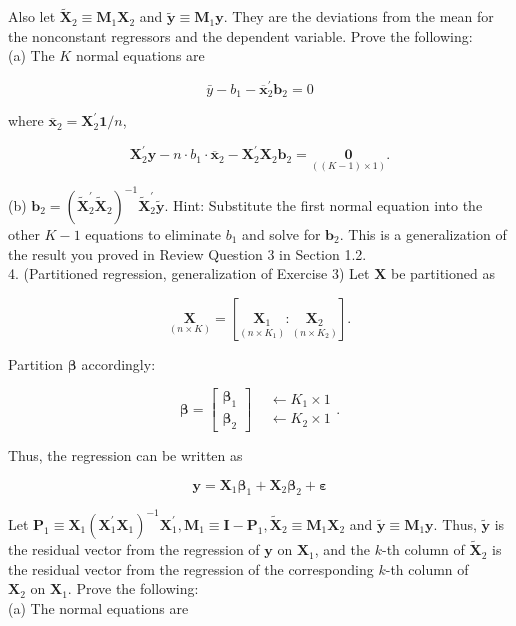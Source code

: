 \documentclass[10pt]{article}
\begin{document}
Also let $\widetilde{\mathbf{X}}_{2} \equiv \mathbf{M}_{1} \mathbf{X}_{2}$ and $\tilde{\mathbf{y}} \equiv \mathbf{M}_{1} \mathbf{y}$. They are the deviations from the mean for the nonconstant regressors and the dependent variable. Prove the following:\\
(a) The $K$ normal equations are

$$
\bar{y}-b_{1}-\overline{\mathbf{x}}_{2}^{\prime} \mathbf{b}_{2}=0
$$

where $\overline{\mathbf{x}}_{2}=\mathbf{X}_{2}^{\prime} \mathbf{1} / n$,

$$
\mathbf{X}_{2}^{\prime} \mathbf{y}-n \cdot b_{1} \cdot \overline{\mathbf{x}}_{2}-\mathbf{X}_{2}^{\prime} \mathbf{X}_{2} \mathbf{b}_{2}=\underset{((K-1) \times 1)}{\mathbf{0}} .
$$

(b) $\mathbf{b}_{2}=\left(\widetilde{\mathbf{X}}_{2}^{\prime} \widetilde{\mathbf{X}}_{2}\right)^{-1} \widetilde{\mathbf{X}}_{2}^{\prime} \tilde{\mathbf{y}}$. Hint: Substitute the first normal equation into the other $K-1$ equations to eliminate $b_{1}$ and solve for $\mathbf{b}_{2}$. This is a generalization of the result you proved in Review Question 3 in Section 1.2.\\
4. (Partitioned regression, generalization of Exercise 3) Let $\mathbf{X}$ be partitioned as

$$
\underset{(n \times K)}{\mathbf{X}}=\left[\underset{\left(n \times K_{1}\right)}{\mathbf{X}_{1}}: \underset{\left(n \times K_{2}\right)}{\mathbf{X}_{2}}\right] .
$$

Partition $\boldsymbol{\beta}$ accordingly:

$$
\boldsymbol{\beta}=\left[\begin{array}{l}
\boldsymbol{\beta}_{1} \\
\boldsymbol{\beta}_{2}
\end{array}\right] \begin{aligned}
& \leftarrow K_{1} \times 1 \\
& \leftarrow K_{2} \times 1
\end{aligned} .
$$

Thus, the regression can be written as

$$
\mathbf{y}=\mathbf{X}_{1} \boldsymbol{\beta}_{1}+\mathbf{X}_{2} \boldsymbol{\beta}_{2}+\boldsymbol{\varepsilon}
$$

Let $\mathbf{P}_{1} \equiv \mathbf{X}_{1}\left(\mathbf{X}_{1}^{\prime} \mathbf{X}_{1}\right)^{-1} \mathbf{X}_{1}^{\prime}, \mathbf{M}_{1} \equiv \mathbf{I}-\mathbf{P}_{1}, \widetilde{\mathbf{X}}_{2} \equiv \mathbf{M}_{1} \mathbf{X}_{2}$ and $\tilde{\mathbf{y}} \equiv \mathbf{M}_{1} \mathbf{y}$. Thus, $\tilde{\mathbf{y}}$ is the residual vector from the regression of $\mathbf{y}$ on $\mathbf{X}_{1}$, and the $k$-th column of $\widetilde{\mathbf{X}}_{2}$ is the residual vector from the regression of the corresponding $k$-th column of\\
$\mathbf{X}_{2}$ on $\mathbf{X}_{1}$. Prove the following:\\
(a) The normal equations are
\end{document}
